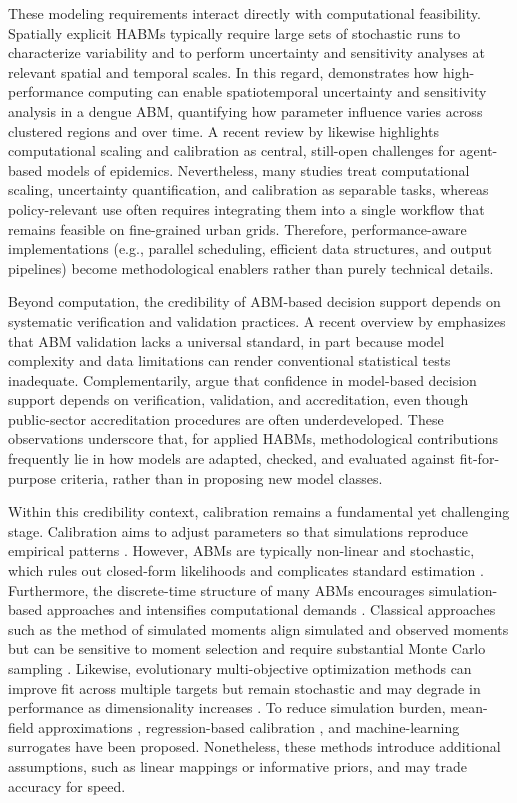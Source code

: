 \documentclass[applsci,article,accept,pdftex,moreauthors]{Definitions/mdpi}
\begin{document}
These modeling requirements interact directly with computational feasibility. Spatially explicit HABMs typically require large sets of stochastic runs to characterize variability and to perform uncertainty and sensitivity analyses at relevant spatial and temporal scales. In this regard, \cite{cyberCIS} demonstrates how high-performance computing can enable spatiotemporal uncertainty and sensitivity analysis in a dengue ABM, quantifying how parameter influence varies across clustered regions and over time. A recent review by \cite{Zhang2025ABMEpidemicsReview} likewise highlights computational scaling and calibration as central, still-open challenges for agent-based models of epidemics. Nevertheless, many studies treat computational scaling, uncertainty quantification, and calibration as separable tasks, whereas policy-relevant use often requires integrating them into a single workflow that remains feasible on fine-grained urban grids. Therefore, performance-aware implementations (e.g., parallel scheduling, efficient data structures, and output pipelines) become methodological enablers rather than purely technical details.

Beyond computation, the credibility of ABM-based decision support depends on systematic verification and validation practices. A recent overview by \cite{validationOverview} emphasizes that ABM validation lacks a universal standard, in part because model complexity and data limitations can render conventional statistical tests inadequate. Complementarily, \cite{credibilityPaper} argue that confidence in model-based decision support depends on verification, validation, and accreditation, even though public-sector accreditation procedures are often underdeveloped. These observations underscore that, for applied HABMs, methodological contributions frequently lie in how models are adapted, checked, and evaluated against fit-for-purpose criteria, rather than in proposing new model classes.

Within this credibility context, calibration remains a fundamental yet challenging stage. Calibration aims to adjust parameters so that simulations reproduce empirical patterns \cite{emo}. However, ABMs are typically non-linear and stochastic, which rules out closed-form likelihoods and complicates standard estimation \cite{Fagiolo2019}. Furthermore, the discrete-time structure of many ABMs encourages simulation-based approaches and intensifies computational demands \cite{fagiolo2007}. Classical approaches such as the method of simulated moments align simulated and observed moments but can be sensitive to moment selection and require substantial Monte Carlo sampling \cite{chenchang,Fagiolo2019}. Likewise, evolutionary multi-objective optimization methods can improve fit across multiple targets but remain stochastic and may degrade in performance as dimensionality increases \cite{emo}. To reduce simulation burden, mean-field approximations \cite{mean_field_method}, regression-based calibration \cite{regression}, and machine-learning surrogates \cite{machinelear} have been proposed. Nonetheless, these methods introduce additional assumptions, such as linear mappings or informative priors, and may trade accuracy for speed.
\end{document}
